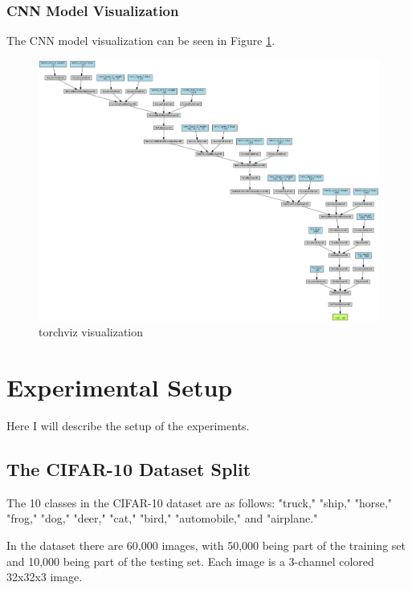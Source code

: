 \documentclass{article}
\begin{document}
\subsubsection{CNN Model Visualization}
The CNN model visualization can be seen in Figure \ref{fig:model_vis}.
\begin{adjustwidth}{-0.25in}{-0.25in}
    \begin{figure}[]
        \centering
        \includegraphics[width=7.25in]{plots_final/cnn_torchviz.png}
        \caption{torchviz visualization}
        \label{fig:model_vis}
    \end{figure}
\end{adjustwidth}

\section{Experimental Setup}
Here I will describe the setup of the experiments.
\subsection{The CIFAR-10 Dataset Split}
The 10 classes in the CIFAR-10 dataset are as follows: "truck," "ship," "horse," "frog," "dog," "deer," "cat," "bird," "automobile," and "airplane."

In the dataset there are 60,000 images, with 50,000 being part of the training set and 10,000 being part of the testing set. Each image is a 3-channel colored 32x32x3 image.
\end{document}
